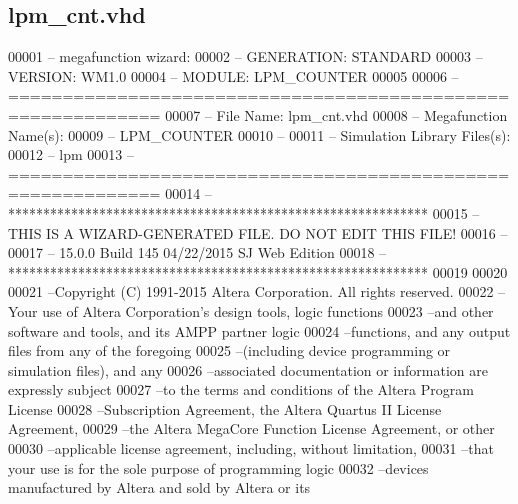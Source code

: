 \subsection{lpm\+\_\+cnt.\+vhd}
\label{lpm__cnt_8vhd_source}

\begin{DoxyCode}
00001 \textcolor{keyword}{-- megafunction wizard: %
00002 \textcolor{keyword}{-- GENERATION: STANDARD}
00003 \textcolor{keyword}{-- VERSION: WM1.0}
00004 \textcolor{keyword}{-- MODULE: LPM\_COUNTER }
00005 
00006 \textcolor{keyword}{-- ============================================================}
00007 \textcolor{keyword}{-- File Name: lpm\_cnt.vhd}
00008 \textcolor{keyword}{-- Megafunction Name(s):}
00009 \textcolor{keyword}{--          LPM\_COUNTER}
00010 \textcolor{keyword}{--}
00011 \textcolor{keyword}{-- Simulation Library Files(s):}
00012 \textcolor{keyword}{--          lpm}
00013 \textcolor{keyword}{-- ============================================================}
00014 \textcolor{keyword}{-- ************************************************************}
00015 \textcolor{keyword}{-- THIS IS A WIZARD-GENERATED FILE. DO NOT EDIT THIS FILE!}
00016 \textcolor{keyword}{--}
00017 \textcolor{keyword}{-- 15.0.0 Build 145 04/22/2015 SJ Web Edition}
00018 \textcolor{keyword}{-- ************************************************************}
00019 
00020 
00021 \textcolor{keyword}{--Copyright (C) 1991-2015 Altera Corporation. All rights reserved.}
00022 \textcolor{keyword}{--Your use of Altera Corporation's design tools, logic functions }
00023 \textcolor{keyword}{--and other software and tools, and its AMPP partner logic }
00024 \textcolor{keyword}{--functions, and any output files from any of the foregoing }
00025 \textcolor{keyword}{--(including device programming or simulation files), and any }
00026 \textcolor{keyword}{--associated documentation or information are expressly subject }
00027 \textcolor{keyword}{--to the terms and conditions of the Altera Program License }
00028 \textcolor{keyword}{--Subscription Agreement, the Altera Quartus II License Agreement,}
00029 \textcolor{keyword}{--the Altera MegaCore Function License Agreement, or other }
00030 \textcolor{keyword}{--applicable license agreement, including, without limitation, }
00031 \textcolor{keyword}{--that your use is for the sole purpose of programming logic }
00032 \textcolor{keyword}{--devices manufactured by Altera and sold by Altera or its }
}
\end{DoxyCode}
